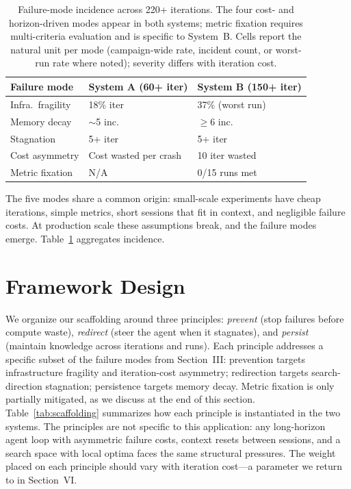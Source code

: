 \documentclass[conference]{IEEEtran}
\begin{document}
\begin{table}[tbp]
  \caption{Failure-mode incidence across 220+ iterations. The four cost- and horizon-driven modes appear in both systems; metric fixation requires multi-criteria evaluation and is specific to System~B. Cells report the natural unit per mode (campaign-wide rate, incident count, or worst-run rate where noted); severity differs with iteration cost.}
  \label{tab:failure-frequency}
  \centering
  \begin{tabular}{lll}
    \toprule
    Failure mode & System A (60+ iter) & System B (150+ iter) \\
    \midrule
    Infra.\ fragility    & 18\% iter   & 37\% (worst run) \\
    Memory decay         & ${\sim}$5 inc.\ & ${\geq}6$ inc.\ \\
    Stagnation           & 5+ iter      & 5+ iter \\
    Cost asymmetry       & Cost wasted per crash & 10 iter wasted \\
    Metric fixation      & N/A          & 0/15 runs met \\
    \bottomrule
  \end{tabular}
\end{table}

The five modes share a common origin: small-scale experiments have cheap iterations, simple metrics, short sessions that fit in context, and negligible failure costs. At production scale these assumptions break, and the failure modes emerge. Table~\ref{tab:failure-frequency} aggregates incidence.

\section{Framework Design}

We organize our scaffolding around three principles: \textit{prevent} (stop failures before compute waste), \textit{redirect} (steer the agent when it stagnates), and \textit{persist} (maintain knowledge across iterations and runs). Each principle addresses a specific subset of the failure modes from Section~III: prevention targets infrastructure fragility and iteration-cost asymmetry; redirection targets search-direction stagnation; persistence targets memory decay. Metric fixation is only partially mitigated, as we discuss at the end of this section. Table~\ref{tab:scaffolding} summarizes how each principle is instantiated in the two systems. The principles are not specific to this application: any long-horizon agent loop with asymmetric failure costs, context resets between sessions, and a search space with local optima faces the same structural pressures. The weight placed on each principle should vary with iteration cost—a parameter we return to in Section~VI.
\end{document}
